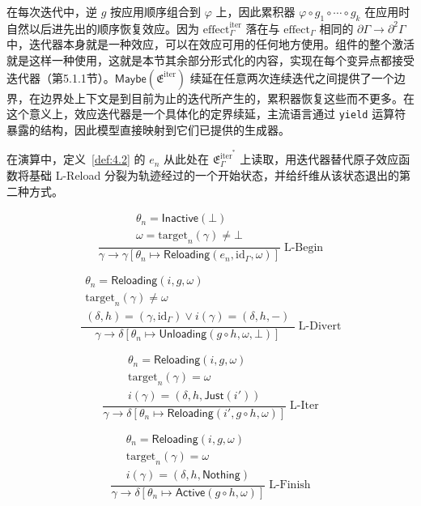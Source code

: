 在每次迭代中，逆 $g$ 按应用顺序组合到 $\varphi$ 上，因此累积器 $\varphi \circ g_1 \circ \cdots \circ g_k$ 在应用时自然以后进先出的顺序恢复效应。因为 $\mathrm{effect}^{\mathrm{iter}}_\Gamma$ 落在与 $\mathrm{effect}_\Gamma$ 相同的 $\partial\Gamma \to \partial^2\Gamma$ 中，迭代器本身就是一种效应，可以在效应可用的任何地方使用。组件的整个激活就是这样一种使用，这就是本节其余部分形式化的内容，实现在每个变异点都接受迭代器（第5.1.1节）。$\mathsf{Maybe}(\mathfrak{E}^{\mathrm{iter}})$ 续延在任意两次连续迭代之间提供了一个边界，在边界处上下文是到目前为止的迭代所产生的，累积器恢复这些而不更多。在这个意义上，效应迭代器是一个具体化的定界续延，主流语言通过 \texttt{yield} 运算符暴露的结构\cite{ref43}，因此模型直接映射到它们已提供的生成器。

在演算中，定义~\ref{def:4.2} 的 $e_n$ 从此处在 $\mathfrak{E}^{\mathrm{iter}^*}_\Gamma$ 上读取，用迭代器替代原子效应函数将基础 L-Reload 分裂为轨迹经过的一个开始状态，并给纤维从该状态退出的第二种方式。

\[
\frac{
\begin{array}{c}
\theta_n = \mathsf{Inactive}(\bot) \\
\omega = \mathrm{target}_n(\gamma) \neq \bot
\end{array}
}{
\gamma \longrightarrow \gamma[\theta_n \mapsto \mathsf{Reloading}(e_n, \mathrm{id}_\Gamma, \omega)]
}\;\text{L-Begin}
\]

\[
\frac{
\begin{array}{c}
\theta_n = \mathsf{Reloading}(i, g, \omega) \\
\mathrm{target}_n(\gamma) \neq \omega \\
(\delta, h) = (\gamma, \mathrm{id}_\Gamma) \lor i(\gamma) = (\delta, h, -)
\end{array}
}{
\gamma \longrightarrow \delta[\theta_n \mapsto \mathsf{Unloading}(g \circ h, \omega, \bot)]
}\;\text{L-Divert}
\]

\[
\frac{
\begin{array}{c}
\theta_n = \mathsf{Reloading}(i, g, \omega) \\
\mathrm{target}_n(\gamma) = \omega \\
i(\gamma) = (\delta, h, \mathsf{Just}(i'))
\end{array}
}{
\gamma \longrightarrow \delta[\theta_n \mapsto \mathsf{Reloading}(i', g \circ h, \omega)]
}\;\text{L-Iter}
\]

\[
\frac{
\begin{array}{c}
\theta_n = \mathsf{Reloading}(i, g, \omega) \\
\mathrm{target}_n(\gamma) = \omega \\
i(\gamma) = (\delta, h, \mathsf{Nothing})
\end{array}
}{
\gamma \longrightarrow \delta[\theta_n \mapsto \mathsf{Active}(g \circ h, \omega)]
}\;\text{L-Finish}
\]


